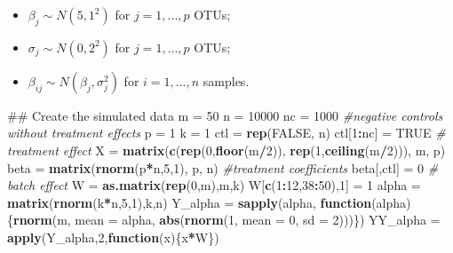 \documentclass[]{book}
\newenvironment{Shaded}{\begin{snugshade}}{\end{snugshade}}
\newcommand{\KeywordTok}[1]{\textcolor[rgb]{0.13,0.29,0.53}{\textbf{#1}}}
\newcommand{\DataTypeTok}[1]{\textcolor[rgb]{0.13,0.29,0.53}{#1}}
\newcommand{\DecValTok}[1]{\textcolor[rgb]{0.00,0.00,0.81}{#1}}
\newcommand{\StringTok}[1]{\textcolor[rgb]{0.31,0.60,0.02}{#1}}
\newcommand{\CommentTok}[1]{\textcolor[rgb]{0.56,0.35,0.01}{\textit{#1}}}
\newcommand{\OtherTok}[1]{\textcolor[rgb]{0.56,0.35,0.01}{#1}}
\newcommand{\ControlFlowTok}[1]{\textcolor[rgb]{0.13,0.29,0.53}{\textbf{#1}}}
\newcommand{\OperatorTok}[1]{\textcolor[rgb]{0.81,0.36,0.00}{\textbf{#1}}}
\newcommand{\NormalTok}[1]{#1}
\providecommand{\tightlist}{%
  \setlength{\itemsep}{0pt}\setlength{\parskip}{0pt}}
\begin{document}
\begin{itemize}
\tightlist
\item
  \(\beta_{j} \sim N(5,1^{2})\) for \(j=1,...,p\) OTUs;\\
\item
  \(\sigma_{j} \sim N(0,2^{2})\) for \(j=1,...,p\) OTUs;\\
\item
  \(\beta_{ij} \sim N(\beta_{j}, \sigma_{j}^{2})\) for \(i = 1,...,n\)
  samples.
\end{itemize}

\begin{Shaded}
\begin{Highlighting}[]
\NormalTok{## Create the simulated data}
\NormalTok{m =}\StringTok{ }\DecValTok{50}
\NormalTok{n =}\StringTok{ }\DecValTok{10000}
\NormalTok{nc =}\StringTok{ }\DecValTok{1000} \CommentTok{#negative controls without treatment effects}
\NormalTok{p =}\StringTok{ }\DecValTok{1}
\NormalTok{k =}\StringTok{ }\DecValTok{1}
\NormalTok{ctl =}\StringTok{ }\KeywordTok{rep}\NormalTok{(}\OtherTok{FALSE}\NormalTok{, n)}
\NormalTok{ctl[}\DecValTok{1}\OperatorTok{:}\NormalTok{nc] =}\StringTok{ }\OtherTok{TRUE}
\CommentTok{# treatment effect}
\NormalTok{X =}\StringTok{ }\KeywordTok{matrix}\NormalTok{(}\KeywordTok{c}\NormalTok{(}\KeywordTok{rep}\NormalTok{(}\DecValTok{0}\NormalTok{,}\KeywordTok{floor}\NormalTok{(m}\OperatorTok{/}\DecValTok{2}\NormalTok{)), }\KeywordTok{rep}\NormalTok{(}\DecValTok{1}\NormalTok{,}\KeywordTok{ceiling}\NormalTok{(m}\OperatorTok{/}\DecValTok{2}\NormalTok{))), m, p)}
\NormalTok{beta =}\StringTok{ }\KeywordTok{matrix}\NormalTok{(}\KeywordTok{rnorm}\NormalTok{(p}\OperatorTok{*}\NormalTok{n,}\DecValTok{5}\NormalTok{,}\DecValTok{1}\NormalTok{), p, n) }\CommentTok{#treatment coefficients}
\NormalTok{beta[,ctl] =}\StringTok{ }\DecValTok{0}
\CommentTok{# batch effect}
\NormalTok{W =}\StringTok{ }\KeywordTok{as.matrix}\NormalTok{(}\KeywordTok{rep}\NormalTok{(}\DecValTok{0}\NormalTok{,m),m,k)}
\NormalTok{W[}\KeywordTok{c}\NormalTok{(}\DecValTok{1}\OperatorTok{:}\DecValTok{12}\NormalTok{,}\DecValTok{38}\OperatorTok{:}\DecValTok{50}\NormalTok{),}\DecValTok{1}\NormalTok{] =}\StringTok{  }\DecValTok{1}
\NormalTok{alpha =}\StringTok{ }\KeywordTok{matrix}\NormalTok{(}\KeywordTok{rnorm}\NormalTok{(k}\OperatorTok{*}\NormalTok{n,}\DecValTok{5}\NormalTok{,}\DecValTok{1}\NormalTok{),k,n)}
\NormalTok{Y_alpha =}\StringTok{ }\KeywordTok{sapply}\NormalTok{(alpha, }\ControlFlowTok{function}\NormalTok{(alpha)\{}\KeywordTok{rnorm}\NormalTok{(m, }\DataTypeTok{mean =}\NormalTok{  alpha, }\KeywordTok{abs}\NormalTok{(}\KeywordTok{rnorm}\NormalTok{(}\DecValTok{1}\NormalTok{, }\DataTypeTok{mean =} \DecValTok{0}\NormalTok{, }\DataTypeTok{sd =} \DecValTok{2}\NormalTok{)))\})}
\NormalTok{YY_alpha =}\StringTok{ }\KeywordTok{apply}\NormalTok{(Y_alpha,}\DecValTok{2}\NormalTok{,}\ControlFlowTok{function}\NormalTok{(x)\{x}\OperatorTok{*}\NormalTok{W\})}


\end{Highlighting}
\end{Shaded}
\end{document}
